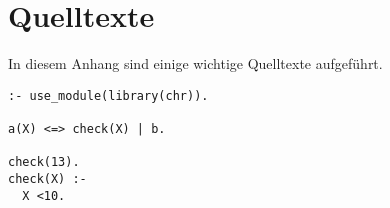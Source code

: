 \chapter{Quelltexte}

In diesem Anhang sind einige wichtige Quelltexte aufgeführt.

\begin{lstlisting}
:- use_module(library(chr)).

a(X) <=> check(X) | b.

check(13).
check(X) :-
  X <10.
\end{lstlisting}
